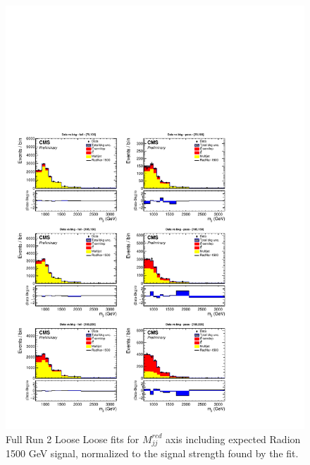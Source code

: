 \begin{figure}[!htb]
	\centering
	\includegraphics[width=1\textwidth]{Figures/postfit_projy_fits_LL.pdf}
	\caption{Full Run 2 Loose Loose fits for $M_{jj}^{red}$ axis including expected Radion 1500 GeV signal, normalized to the signal strength found by the fit.}
	\label{fig:LLmjj}
\end{figure}
